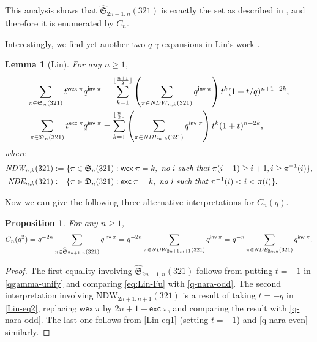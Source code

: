 \documentclass[12pt,reqno]{amsart}
\numberwithin{equation}{section}
\theoremstyle{plain}
\newtheorem{lemma}[theorem]{Lemma}
\newtheorem{proposition}[theorem]{Proposition}
\theoremstyle{definition}
\def\S{\mathfrak{S}}
\def\D{\mathfrak{D}}
\def\exc{\mathsf{exc}}
\def\inv{\mathsf{inv}}
\def\wex{\mathsf{wex}}
\begin{document}
This analysis shows that $\widehat{\S}_{2n+1,n}(321)$ is exactly the set as described in \cite[Excercise 145]{Sta2}, and therefore it is enumerated by $C_n$.

Interestingly, we find yet another two $q$-$\gamma$-expansions in Lin's work \cite[Theorems~1.2 and 1.4]{Lin17}.
\begin{lemma}[Lin]
For any $n\ge 1$,
\begin{align}
\sum_{\pi\in\S_n(321)}t^{\wex\:\pi}q^{\inv\:\pi} &=\sum_{k=1}^{\lfloor\frac{n+1}{2}\rfloor}\left(\sum_{\pi\in\emph{NDW}_{n,k}(321)}q^{\inv\:\pi}\right)t^k(1+t/q)^{n+1-2k},\label{Lin-eq2}\\
\sum_{\pi\in\D_n(321)}t^{\exc\:\pi}q^{\inv\:\pi} &=\sum_{k=1}^{\lfloor\frac{n}{2}\rfloor}\left(\sum_{\pi\in\emph{NDE}_{n,k}(321)}q^{\inv\:\pi}\right)t^k(1+t)^{n-2k},\label{Lin-eq1}
\end{align}
where
\begin{align*}
\emph{NDW}_{n,k}(321) &:=\{\pi\in\S_{n}(321):\wex\:\pi=k,~\emph{no}~i~\emph{such~that}~\pi(i+1)\geq i+1, i\geq\pi^{-1}(i)\},\\
\emph{NDE}_{n,k}(321) &:=\{\pi\in\D_{n}(321):\exc\:\pi=k,~\emph{no $i$ such that $\pi^{-1}(i)<i<\pi(i)$}\}.
\end{align*}
\end{lemma}


Now we can give the following three alternative interpretations for $C_n(q)$.
\begin{proposition}\label{cnq: three sets}
For any $n\geq1$,
\begin{align*}
C_n(q^2)=q^{-2n}\sum_{\pi\in\widehat{\S}_{2n+1,n}(321)}q^{\inv\:\pi} =q^{-2n}\sum_{\pi\in\emph{NDW}_{2n+1,n+1}(321)}q^{\inv\:\pi}=q^{-n}\sum_{\pi\in\emph{NDE}_{2n,n}(321)}q^{\inv\:\pi}.
\end{align*}
\end{proposition}
\begin{proof}
The first equality involving $\widehat{\S}_{2n+1,n}(321)$ follows from putting $t=-1$ in \eqref{qgamma-unify} and comparing \eqref{eq:Lin-Fu} with \eqref{q-nara-odd}. The second interpretation involving $\text{NDW}_{2n+1,n+1}(321)$ is a result of taking $t=-q$ in \eqref{Lin-eq2}, replacing $\wex\:\pi$ by $2n+1-\exc\:\pi$, and comparing the result with \eqref{q-nara-odd}. The last one follows from \eqref{Lin-eq1} (setting $t=-1$) and \eqref{q-nara-even} similarly.
\end{proof}
\end{document}
